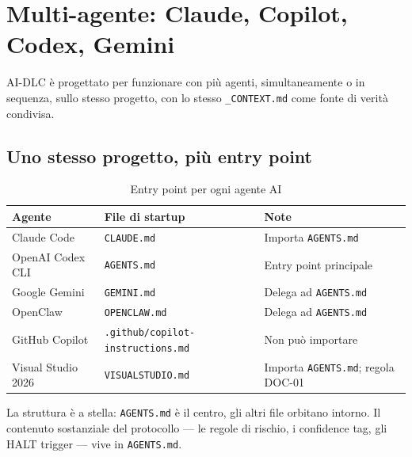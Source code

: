 ﻿%

\chapter{Multi-agente: Claude, Copilot, Codex, Gemini}
\label{ch:multi-agente}

AI-DLC è progettato per funzionare con più agenti, simultaneamente o in sequenza, sullo stesso progetto, con lo stesso \texttt{\_CONTEXT.md} come fonte di verità condivisa.

\section{Uno stesso progetto, più entry point}
\label{sec:14-entry-point}

\begin{table}[htbp]
  \centering
  \begin{tabular}{lll}
    \toprule
    \textbf{Agente} & \textbf{File di startup} & \textbf{Note} \\
    \midrule
    Claude Code & \texttt{CLAUDE.md} & Importa \texttt{AGENTS.md} \\
    OpenAI Codex CLI & \texttt{AGENTS.md} & Entry point principale \\
    Google Gemini & \texttt{GEMINI.md} & Delega ad \texttt{AGENTS.md} \\
    OpenClaw & \texttt{OPENCLAW.md} & Delega ad \texttt{AGENTS.md} \\
    GitHub Copilot & \texttt{.github/copilot-instructions.md} & Non può importare \\
    Visual Studio 2026 & \texttt{VISUALSTUDIO.md} & Importa \texttt{AGENTS.md}; regola DOC-01 \\
    \bottomrule
  \end{tabular}
  \caption{Entry point per ogni agente AI}
  \label{tab:14-entry-points}
\end{table}

La struttura è a stella: \texttt{AGENTS.md} è il centro, gli altri file orbitano intorno. Il contenuto sostanziale del protocollo --- le regole di rischio, i confidence tag, gli HALT trigger --- vive in \texttt{AGENTS.md}.


